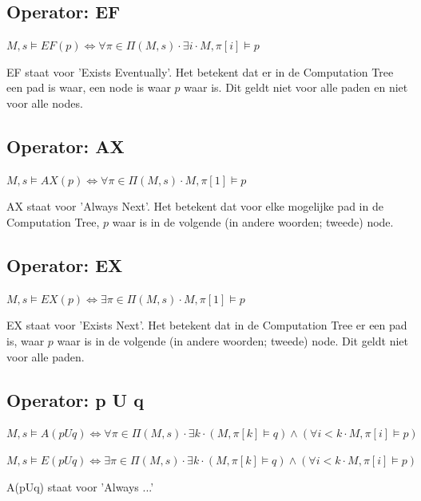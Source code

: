 \documentclass{article}
\begin{document}
		\subsection{Operator: EF}
				
		\( M, s \models EF(p) \iff \forall \pi \in \Pi (M, s) \cdot \exists i \cdot M, \pi [i] \models p\)

		EF staat voor 'Exists Eventually'. Het betekent dat er in de Computation Tree een pad is waar, een node is waar \( p \) waar is. Dit geldt niet voor alle paden en niet voor alle nodes.
		
		\subsection{Operator: AX}
				
		\( M, s \models AX(p) \iff \forall \pi \in \Pi (M, s) \cdot M, \pi [1] \models p\)

		AX staat voor 'Always Next'. Het betekent dat voor elke mogelijke pad in de Computation Tree, \( p \) waar is in de volgende (in andere woorden; tweede) node. 
		
		\subsection{Operator: EX}
				
		\( M, s \models EX(p) \iff \exists \pi \in \Pi (M, s) \cdot M, \pi [1] \models p\)

		EX staat voor 'Exists Next'. Het betekent dat in de Computation Tree er een pad is, waar \( p \) waar is in de volgende (in andere woorden; tweede) node. Dit geldt niet voor alle paden.
		
		\subsection{Operator: p U q}
				
		\( M, s \models A(pUq) \iff \forall \pi \in \Pi (M, s) \cdot \exists k \cdot (M, \pi [k] \models q) \land (\forall i < k \cdot M, \pi[i] \models p)\)

		\( M, s \models E(pUq) \iff \exists \pi \in \Pi (M, s) \cdot \exists k \cdot (M, \pi [k] \models q) \land (\forall i < k \cdot M, \pi[i] \models p)\)

		A(pUq) staat voor 'Always ...' 
\end{document}
